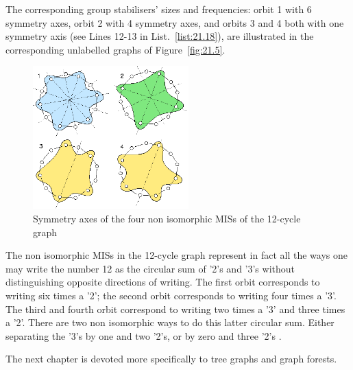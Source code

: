 The corresponding group stabilisers' sizes and frequencies: orbit 1 with 6 symmetry axes, orbit 2 with 4 symmetry axes, and orbits 3 and 4 both with one symmetry axis (see Lines 12-13 in List.~\vref{list:21.18}), are illustrated in the corresponding unlabelled graphs of Figure~\vref{fig:21.5}.
\begin{figure}[ht]
\sidecaption[t]
\includegraphics[width=6cm]{Figures/21-5-c12.png}
\caption{Symmetry axes of the four non isomorphic MISs of the 12-cycle graph} 
\label{fig:21.5}       %
\end{figure}

The non isomorphic MISs in the 12-cycle graph represent in fact all the ways one may write the number 12 as the circular sum of '2's and '3's without distinguishing opposite directions of writing. The first orbit corresponds to writing six times a '2'; the second orbit corresponds to writing four times a '3'. The third and fourth orbit correspond to writing two times a '3' and three times a '2'. There are two non isomorphic ways to do this latter circular sum. Either separating the '3's by one and two '2's, or by zero and three '2's \citep{ISO-2008}.

\vspace{1cm}

\noindent The next chapter is devoted more specifically to tree graphs and graph forests.

\clearpage
%


